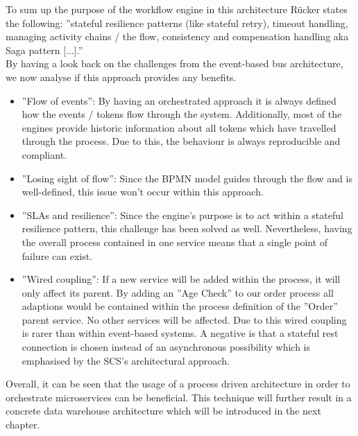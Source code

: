 To sum up the purpose of the workflow engine in this architecture Rücker states the following: ''stateful resilience patterns (like stateful retry), timeout handling, managing activity chains / the flow, consistency and compensation handling aka Saga pattern [...].'' \cite{orchestrationMicroServices}\newline
\\
By having a look back on the challenges from the event-based bus architecture, we now analyse if this approach provides any benefits. \\
\begin{itemize}
    \item ''Flow of events'': By having an orchestrated approach it is always defined how the events / tokens flow through the system. Additionally, most of the engines provide historic information about all tokens which have travelled through the process. Due to this, the behaviour is always reproducible and compliant. 
    \item ''Losing sight of flow'': Since the BPMN model guides through the flow and is well-defined, this issue won't occur within this approach.
    \item ''SLAs and resilience'': Since the engine's purpose is to act within a stateful resilience pattern, this challenge has been solved as well. Nevertheless, having the overall process contained in one service means that a single point of failure can exist. 
    \item ''Wired coupling'': If a new service will be added within the process, it will only affect its parent. By adding an ''Age Check'' to our order process all adaptions would be contained within the process definition of the ''Order'' parent service. No other services will be affected. Due to this wired coupling is rarer than within event-based systems. A negative is that a stateful \acrshort{rest} connection is chosen instead of an asynchronous possibility which is emphasised by the SCS's architectural approach. 
\end{itemize}
Overall, it can be seen that the usage of a process driven architecture in order to orchestrate microservices can be beneficial. This technique will further result in a concrete data warehouse architecture which will be introduced in the next chapter. 
